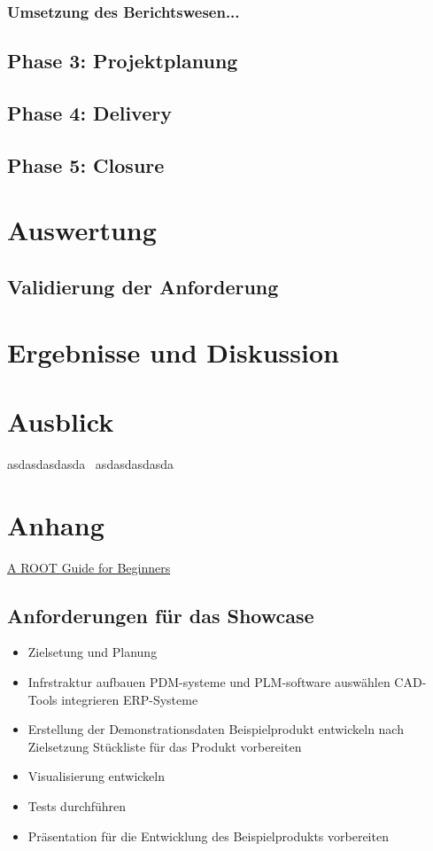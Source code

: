 \documentclass[a4paper, 12pt]{scrartcl}
\begin{document}
	\subsubsection{Umsetzung des Berichtswesen...}
	\newpage
	\subsection{Phase 3: Projektplanung}
	\newpage
	\subsection{Phase 4: Delivery}
	\newpage
	\subsection{Phase 5: Closure}
	\newpage
	\section{Auswertung}
	\subsection{Validierung der Anforderung}%
	\newpage
	\section{Ergebnisse und Diskussion}
		\newpage
	\section{Ausblick}
	asdasdasdasda~\cite{karmasin2017gestaltung}
	asdasdasdasda~\cite{prevezanos2013technisches}
		\newpage
	\section{Anhang}
	
	
	\href{https://root.cern.ch/root/htmldoc/guides/primer/ROOTPrimer.html}{A ROOT Guide for Beginners}
	\subsection{Anforderungen für das Showcase}
	\begin{itemize}
		\item Zielsetung und Planung
		\item Infrstraktur aufbauen
		\subitem PDM-systeme und PLM-software auswählen
		\subitem CAD-Tools integrieren
		\subitem ERP-Systeme 
		\item Erstellung der Demonstrationsdaten
		\subitem Beispielprodukt entwickeln nach Zielsetzung
		\subitem Stückliste für das Produkt vorbereiten
		\item Visualisierung entwickeln
		\item Tests durchführen
		\item Präsentation für die Entwicklung des Beispielprodukts vorbereiten 
	\end{itemize}
\end{document}

